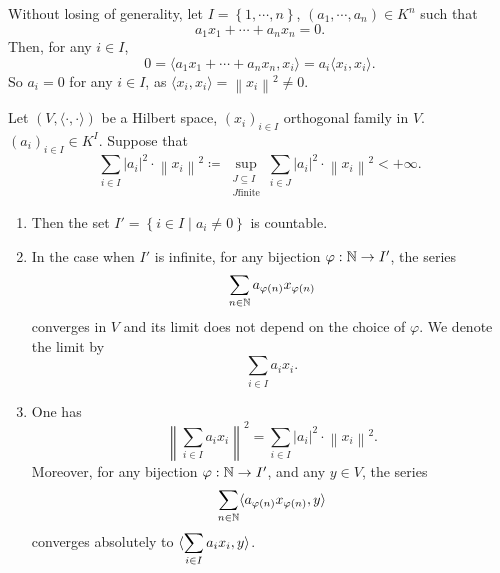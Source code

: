 \begin{proofenv}
    Without losing of generality, let $I = \left\{1,\cdots,n\right\}$, $\left(a_1,\cdots,a_n\right)\in K^n$ such that
    $$ a_1 x_1 + \cdots + a_n x_n =0.$$
    Then, for any $i\in I$, 
    $$ 0 = \langle a_1 x_1 + \cdots + a_n x_n, x_i\rangle = a_i \langle x_i, x_i\rangle.$$
    So $a_i =0$ for any $i\in I$, as $\langle x_i,x_i\rangle = \left\| x_i \right\|^2 \neq 0$.
\end{proofenv}
\begin{propositionenv}
    Let $\left(V, \langle \cdot, \cdot\rangle\right)$ be a Hilbert space, $\left(x_i\right)_{i\in I}$ orthogonal family in $V$. $\left(a_i\right)_{i\in I} \in K^I$. Suppose that 
    $$ \sum_{i\in I} \left|a_i\right|^2 \cdot \left\|x_i\right\|^2 \coloneq \sup_{\substack{J\subseteq I\\ J \text{finite}}} \sum_{i\in J} \left|a_i\right|^2 \cdot \left\|x_i\right\|^2 < +\infty.$$
    \begin{enumerate}
        \item Then the set $I' = \left\{i\in I \mid a_i \neq 0\right\}$ is countable.
        \item In the case when $I'$ is infinite, for any bijection $ \varphi : \mathbb{N} \rightarrow I'$, the series
        $$ \sum_{n\in \mathbb{N}} a_{\varphi(n)} x_{\varphi(n)}$$
        converges in $V$ and its limit does not depend on the choice of $\varphi$.
        We denote the limit by $$\sum_{i\in I} a_i x_i.$$
        \item One has 
        $$ \left\| \sum_{i\in I} a_i x_i\right\|^2 = \sum_{i\in I} \left|a_i\right|^2 \cdot \left\|x_i\right\|^2.$$
        Moreover, for any bijection $\varphi : \mathbb{N} \rightarrow I'$, and any $y \in V$, the series
        $$ \sum_{n\in \mathbb{N}} \langle a_{\varphi(n)} x_{\varphi(n)}, y\rangle$$
        converges absolutely  to $\displaystyle \langle \sum_{i\in I} a_i x_i, y\rangle$.
    \end{enumerate}
\end{propositionenv}


